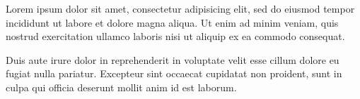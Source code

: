\documentclass{article}
\begin{document}
\begingroup
  \beginnumbering

    \pstart
    \lipsum[1]
    \pend

	\vspace{2ex}
    \pstart
    
    
    \textwidth{}\textwidth Lorem ipsum dolor sit amet, consectetur adipisicing elit, sed do eiusmod tempor incididunt ut labore et dolore magna aliqua. Ut enim ad minim veniam, quis nostrud exercitation ullamco laboris nisi ut aliquip ex ea commodo consequat. 
    
    Duis aute irure dolor in reprehenderit in voluptate velit esse cillum dolore eu fugiat nulla pariatur. Excepteur sint occaecat cupidatat non proident, sunt in culpa qui officia deserunt mollit anim id est laborum.
    
    \par
    
    \pend

	\vspace{2ex}
    \pstart
    \lipsum[3]
    \pend

  \endnumbering
\endgroup
\end{document}

